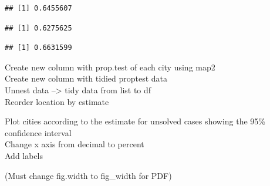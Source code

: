 \documentclass[]{article}
\newenvironment{Shaded}{\begin{snugshade}}{\end{snugshade}}
\newcommand{\NormalTok}[1]{#1}
\newcommand{\OperatorTok}[1]{\textcolor[rgb]{0.81,0.36,0.00}{\textbf{#1}}}
\begin{document}
\begin{verbatim}
## [1] 0.6455607
\end{verbatim}

\begin{Shaded}
\end{Shaded}

\begin{verbatim}
## [1] 0.6275625
\end{verbatim}

\begin{Shaded}
\end{Shaded}

\begin{verbatim}
## [1] 0.6631599
\end{verbatim}

Create new column with prop.test of each city using map2\\
Create new column with tidied proptest data\\
Unnest data --\textgreater{} tidy data from list to df\\
Reorder location by estimate

Plot cities according to the estimate for unsolved cases showing the
95\% confidence interval\\
Change x axis from decimal to percent\\
Add labels

(Must change fig.width to fig\_width for PDF)
\end{document}
